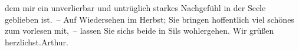 \begin{ledgroupsized}[t]{13cm}
               dem mir ein unverlierbar und untrüglich starkes \introOben{}\strikeout{\textcolor{gray}{×}\-\textcolor{gray}{×}\-\textcolor{gray}{×}\-\textcolor{gray}{×}\-\textcolor{gray}{×}\-\textcolor{gray}{×}\-\textcolor{gray}{×}\-\textcolor{gray}{×}\-\textcolor{gray}{×}\-\textcolor{gray}{×}}\introOben{} Nachgefühl in der Seele geblieben ist. –\pend
           \pstart
           Auf Wiedersehen im Herbst; Sie bringen hoffentlich viel schönes zum
               vorlesen mit, – lassen Sie sichs beide in Sils
               wohlergehen.\pend
           \pstart Wir grüßen herzlichst.\spacefill\mbox{Arthur.}\pend{}\endnumbering{}\end{ledgroupsized}  \newcommand{\dateiname}{L01786}\newcommand{\titel}{Arthur Schnitzler an Hugo von Hofmannsthal, 6. 8. 1908}\newcommand{\editorInnen}{Martin Anton Müller und Gerd-Hermann Susen}
            \footnotesize
\begin{ledgroupsized}[t]{11.5cm}
\end{ledgroupsized}
         
      